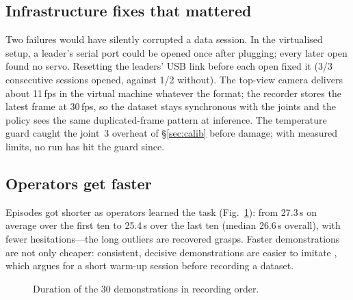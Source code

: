 \documentclass[10pt,twocolumn,letterpaper]{article}
\begin{document}
\subsection{Infrastructure fixes that mattered}
Two failures would have silently corrupted a data session. In the virtualised setup, a leader's serial port could be
opened once after plugging; every later open found no servo. Resetting the leaders' USB link before each open fixed it
(3/3 consecutive sessions opened, against 1/2 without). The top-view camera delivers about 11\,fps in the virtual
machine whatever the format; the recorder stores the latest frame at 30\,fps, so the dataset stays synchronous with the
joints and the policy sees the same duplicated-frame pattern at inference. The temperature guard caught the joint~3
overheat of \S\ref{sec:calib} before damage; with measured limits, no run has hit the guard since.

\subsection{Operators get faster}
Episodes got shorter as operators learned the task (Fig.~\ref{fig:episodes}): from 27.3\,s on average over the first ten
to 25.4\,s over the last ten (median 26.6\,s overall), with fewer hesitations---the long outliers are recovered grasps.
Faster demonstrations are not only cheaper: consistent, decisive demonstrations are easier to imitate
\citep{mandlekar2021matters}, which argues for a short warm-up session before recording a dataset.

\begin{figure}[t]
\centering
{}
\caption{Duration of the 30 demonstrations in recording order.}
\label{fig:episodes}
\end{figure}
\end{document}
